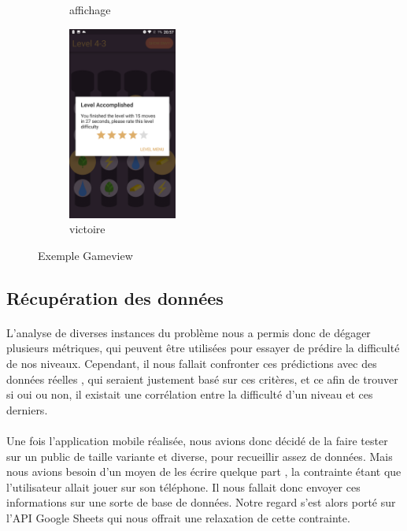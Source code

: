 \documentclass[a4paper, 10pt]{article}
\begin{document}
\begin{figure}[h!]
\begin{subfigure}{0.23\textwidth}
        \caption{affichage}
    \end{subfigure}%
    \begin{subfigure}{0.23\textwidth}
        \centering
        \includegraphics[height=2.5in]{g4}
        \caption{victoire}
    \end{subfigure}
    \caption{Exemple Gameview}
\end{figure}

	\subsection{Récupération des données}
	
	\paragraph{}
	L’analyse de diverses instances du problème nous a permis donc de dégager plusieurs métriques, qui peuvent être utilisées pour essayer de prédire la difficulté de nos niveaux. Cependant, il nous fallait confronter ces prédictions avec des données réelles , qui seraient justement basé sur ces critères, et ce afin de trouver si oui ou non, il existait une corrélation entre la difficulté d’un niveau et ces derniers. 
	\paragraph{}
Une fois l’application mobile réalisée, nous avions donc décidé de la faire tester sur un public de taille variante et diverse, pour recueillir assez de données. Mais nous avions besoin d’un moyen de les écrire quelque part , la contrainte étant que l’utilisateur allait jouer sur son téléphone. Il nous fallait donc envoyer ces informations sur une sorte de base de données. Notre regard s’est alors porté sur l’API Google Sheets qui nous offrait une relaxation de cette contrainte.
\end{document}
